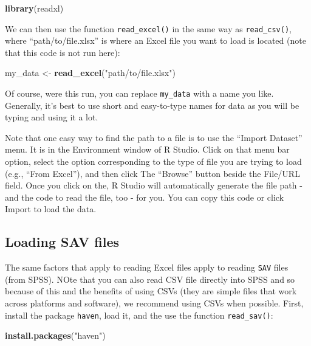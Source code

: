 \documentclass[]{book}
\newenvironment{Shaded}{\begin{snugshade}}{\end{snugshade}}
\newcommand{\KeywordTok}[1]{\textcolor[rgb]{0.13,0.29,0.53}{\textbf{#1}}}
\newcommand{\StringTok}[1]{\textcolor[rgb]{0.31,0.60,0.02}{#1}}
\newcommand{\NormalTok}[1]{#1}
\begin{document}
\begin{Shaded}
\begin{Highlighting}[]
\KeywordTok{library}\NormalTok{(readxl)}
\end{Highlighting}
\end{Shaded}

We can then use the function \texttt{read\_excel()} in the same way as
\texttt{read\_csv()}, where ``path/to/file.xlsx'' is where an Excel file
you want to load is located (note that this code is not run here):

\begin{Shaded}
\begin{Highlighting}[]
\NormalTok{my_data <-}
\StringTok{    }\KeywordTok{read_excel}\NormalTok{(}\StringTok{"path/to/file.xlsx"}\NormalTok{)}
\end{Highlighting}
\end{Shaded}

Of course, were this run, you can replace \texttt{my\_data} with a name
you like. Generally, it's best to use short and easy-to-type names for
data as you will be typing and using it a lot.

Note that one easy way to find the path to a file is to use the ``Import
Dataset'' menu. It is in the Environment window of R Studio. Click on
that menu bar option, select the option corresponding to the type of
file you are trying to load (e.g., ``From Excel''), and then click The
``Browse'' button beside the File/URL field. Once you click on the, R
Studio will automatically generate the file path - and the code to read
the file, too - for you. You can copy this code or click Import to load
the data.

\subsection{Loading SAV files}\label{loading-sav-files}

The same factors that apply to reading Excel files apply to reading
\texttt{SAV} files (from SPSS). NOte that you can also read CSV file
directly into SPSS and so because of this and the benefits of using CSVs
(they are simple files that work across platforms and software), we
recommend using CSVs when possible. First, install the package
\texttt{haven}, load it, and the use the function \texttt{read\_sav()}:

\begin{Shaded}
\begin{Highlighting}[]
\KeywordTok{install.packages}\NormalTok{(}\StringTok{"haven"}\NormalTok{)}
\end{Highlighting}
\end{Shaded}
\end{document}

